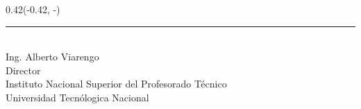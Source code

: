 \documentclass[12pt,a4paper,landscape]{article}
\newlength{\signaturebottommargin}
\begin{document}
\begin{textblock*}{0.42\linewidth}(\dimexpr\paperwidth-0.5cm-0.42\linewidth\relax, \dimexpr\paperheight-\signaturebottommargin-2cm\relax)
    \centering
    \rule{0.5\linewidth}{0.5pt} \\
    {\arialnarrow\fontsize{12pt}{14pt}\selectfont Ing. Alberto Viarengo} \\
    {\arialnarrow\fontsize{10pt}{12pt}\selectfont Director} \\
    {\arialnarrow\fontsize{8pt}{10pt}\selectfont Instituto Nacional Superior del Profesorado Técnico} \\
    {\arialnarrow\fontsize{8pt}{10pt}\selectfont Universidad Tecnólogica Nacional}
\end{textblock*}
\end{document}
